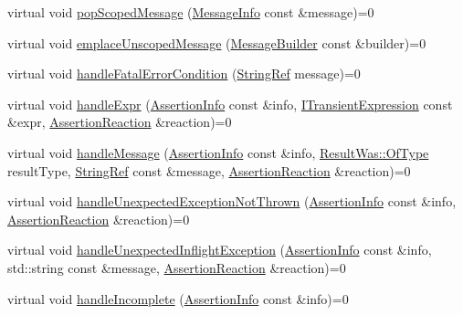 \begin{DoxyCompactItemize}
\item 
virtual void \mbox{\hyperlink{struct_catch_1_1_i_result_capture_a42bcb13276706bf8c3ce081ce16d37fd}{pop\+Scoped\+Message}} (\mbox{\hyperlink{struct_catch_1_1_message_info}{Message\+Info}} const \&message)=0
\item 
virtual void \mbox{\hyperlink{struct_catch_1_1_i_result_capture_a49f74f1323ef8be71b8f9b8e8b2c0fc2}{emplace\+Unscoped\+Message}} (\mbox{\hyperlink{struct_catch_1_1_message_builder}{Message\+Builder}} const \&builder)=0
\item 
virtual void \mbox{\hyperlink{struct_catch_1_1_i_result_capture_a48559e6598ba9474b903697b69c769b2}{handle\+Fatal\+Error\+Condition}} (\mbox{\hyperlink{class_catch_1_1_string_ref}{String\+Ref}} message)=0
\item 
virtual void \mbox{\hyperlink{struct_catch_1_1_i_result_capture_a59a2b05391e464954575d2afb6d5d607}{handle\+Expr}} (\mbox{\hyperlink{struct_catch_1_1_assertion_info}{Assertion\+Info}} const \&info, \mbox{\hyperlink{struct_catch_1_1_i_transient_expression}{I\+Transient\+Expression}} const \&expr, \mbox{\hyperlink{struct_catch_1_1_assertion_reaction}{Assertion\+Reaction}} \&reaction)=0
\item 
virtual void \mbox{\hyperlink{struct_catch_1_1_i_result_capture_a21788ebc64571abf322b80c8cc51794d}{handle\+Message}} (\mbox{\hyperlink{struct_catch_1_1_assertion_info}{Assertion\+Info}} const \&info, \mbox{\hyperlink{struct_catch_1_1_result_was_a624e1ee3661fcf6094ceef1f654601ef}{Result\+Was\+::\+Of\+Type}} result\+Type, \mbox{\hyperlink{class_catch_1_1_string_ref}{String\+Ref}} const \&message, \mbox{\hyperlink{struct_catch_1_1_assertion_reaction}{Assertion\+Reaction}} \&reaction)=0
\item 
virtual void \mbox{\hyperlink{struct_catch_1_1_i_result_capture_a6382ed20486e2d9a020da971c6d5c53d}{handle\+Unexpected\+Exception\+Not\+Thrown}} (\mbox{\hyperlink{struct_catch_1_1_assertion_info}{Assertion\+Info}} const \&info, \mbox{\hyperlink{struct_catch_1_1_assertion_reaction}{Assertion\+Reaction}} \&reaction)=0
\item 
virtual void \mbox{\hyperlink{struct_catch_1_1_i_result_capture_afc97bc69829185222f955ebeef97adfe}{handle\+Unexpected\+Inflight\+Exception}} (\mbox{\hyperlink{struct_catch_1_1_assertion_info}{Assertion\+Info}} const \&info, std\+::string const \&message, \mbox{\hyperlink{struct_catch_1_1_assertion_reaction}{Assertion\+Reaction}} \&reaction)=0
\item 
virtual void \mbox{\hyperlink{struct_catch_1_1_i_result_capture_a89b89372eb09cc44f8dcad363de6157d}{handle\+Incomplete}} (\mbox{\hyperlink{struct_catch_1_1_assertion_info}{Assertion\+Info}} const \&info)=0

\end{DoxyCompactItemize}
